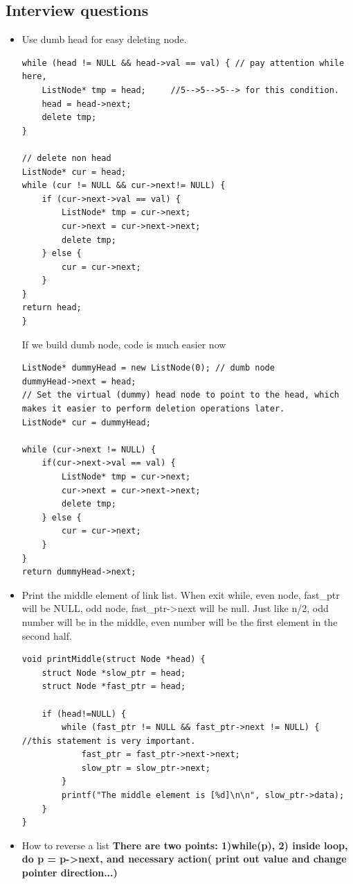 \documentclass[a4paper,11pt,twoside]{book}
\begin{document}
\subsection{Interview questions}
\begin{itemize}
	\item Use dumb head for easy deleting node. 
\begin{lstlisting}
while (head != NULL && head->val == val) { // pay attention while here, 
	ListNode* tmp = head;     //5-->5-->5--> for this condition.
	head = head->next;
	delete tmp;
}

// delete non head 
ListNode* cur = head;
while (cur != NULL && cur->next!= NULL) {
	if (cur->next->val == val) {
		ListNode* tmp = cur->next;
		cur->next = cur->next->next;
		delete tmp;
	} else {
		cur = cur->next;
	}
}
return head;
}
\end{lstlisting}

	If we build dumb node, code is much easier now
\begin{lstlisting}
ListNode* dummyHead = new ListNode(0); // dumb node
dummyHead->next = head; 
// Set the virtual (dummy) head node to point to the head, which makes it easier to perform deletion operations later.
ListNode* cur = dummyHead;

while (cur->next != NULL) {
	if(cur->next->val == val) {
		ListNode* tmp = cur->next;
		cur->next = cur->next->next;
		delete tmp;
	} else {
		cur = cur->next;
	}
}
return dummyHead->next;
\end{lstlisting}
	
	\item Print the middle element of link list. When exit while, even node, fast\_ptr will be NULL, odd node, fast\_ptr->next will be null. Just like n/2, odd number will be in the middle, even number will be the first element in the second half.
\begin{lstlisting}[breaklines]
void printMiddle(struct Node *head) { 
	struct Node *slow_ptr = head; 
	struct Node *fast_ptr = head; 

	if (head!=NULL) {		 
		while (fast_ptr != NULL && fast_ptr->next != NULL) {  //this statement is very important.
			fast_ptr = fast_ptr->next->next; 
			slow_ptr = slow_ptr->next; 
		} 
		printf("The middle element is [%d]\n\n", slow_ptr->data); 
	} 
} 
\end{lstlisting}
	
	\item How to reverse a list \textbf{ There are two points: 1)while(p),  2) inside loop, do p = p->next, and necessary action( print out value and change pointer direction...)}


\end{itemize}
\end{document}
